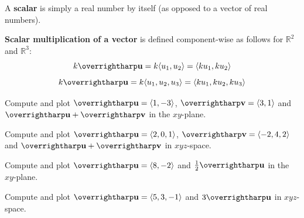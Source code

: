 \documentclass[letterpaper, twoside, 12pt]{book}
\begin{document}
\begin{definition}
  A \textbf{scalar} is simply a real number by itself
  (as opposed to a vector of real numbers).
\end{definition}

\begin{definition}
  \textbf{Scalar multiplication of a vector} is defined component-wise as
  follows for $\mathbb{R}^2$ and $\mathbb{R}^3$:
  \[
    k\harpvec{u}
      =
    k\<u_1,u_2\>
      =
    \<ku_1,ku_2\>
  \]
  \[
    k\harpvec{u}
      =
    k\<u_1,u_2,u_3\>
      =
    \<ku_1,ku_2,ku_3\>
  \]
\end{definition}



          \begin{problem}
            Compute and plot $\harpvec{u}=\<1,-3\>$, $\harpvec{v}=\<3,1\>$
            and $\harpvec{u}+\harpvec{v}$ in the $xy$-plane.
          \end{problem}

          \begin{solution}

          \end{solution}

          \begin{problem}
            Compute and plot $\harpvec{u}=\<2,0,1\>$, $\harpvec{v}=\<-2,4,2\>$
            and $\harpvec{u}+\harpvec{v}$ in $xyz$-space.
          \end{problem}

          \begin{solution}

          \end{solution}

          \begin{problem}
            Compute and plot $\harpvec{u}=\<8,-2\>$ and
            $\frac{1}{2}\harpvec{u}$ in the $xy$-plane.
          \end{problem}

          \begin{solution}

          \end{solution}

          \begin{problem}
            Compute and plot $\harpvec{u}=\<5,3,-1\>$ and
            $3\harpvec{u}$ in $xyz$-space.
          \end{problem}

          \begin{solution}

          \end{solution}
\end{document}
